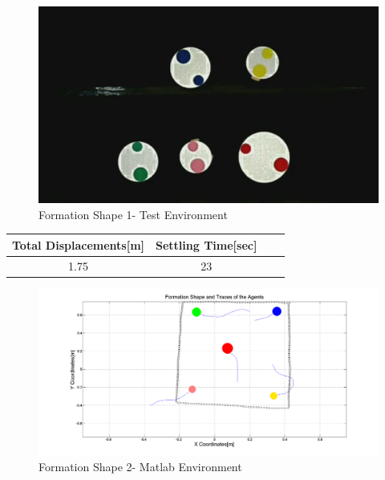 \begin{figure}[H]
\caption{Formation Shape 1- Test Environment}
\centerline{\includegraphics[scale = 0.35]{2_real_hardware}}
\end{figure} 
					
\begin{center}
 \label{hardwareshape1_ref} 
\begin{tabular}{||c| c |c |c ||}
\hline
\textbf{Total Displacements[m]}  & \textbf{Settling Time[sec]}\\ 
\hline
1.75 & 23 \\
\hline
\end{tabular}
\end{center}
		
\begin{figure}[H]
\caption{Formation Shape 2- Matlab Environment}
\centerline{\includegraphics[scale = 0.32]{4_hardware}}
\end{figure} 
					
